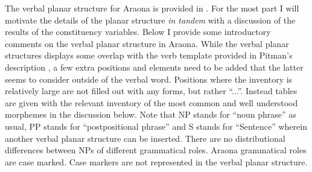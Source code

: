 \documentclass[output=paper,hidelinks]{langscibook}
\begin{document}
The verbal planar structure for Araona is provided in . For the most part I will motivate the details of the planar structure \textit{in tandem} with a discussion of the results of the constituency variables. Below I provide some introductory comments on the verbal planar structure in Araona. While the verbal planar structures displays some overlap with the verb template provided in Pitman's description \citep[108]{pitman:1980:araonasketch}, a few extra positions and elements need to be added that the latter seems to consider outside of the verbal word. Positions where the inventory is relatively large are not filled out with any forms, but rather ``...''. Instead tables are given with the relevant inventory of the most common and well understood morphemes in the discussion below. Note that NP stands for ``noun phrase'' as usual, PP stands for ``postpositional phrase'' and S stands for ``Sentence'' wherein another verbal planar structure can be inserted. There are no distributional differences between NPs of different grammatical roles. Araona grammatical roles are case marked. Case markers are not represented in the verbal planar structure.
\end{document}

